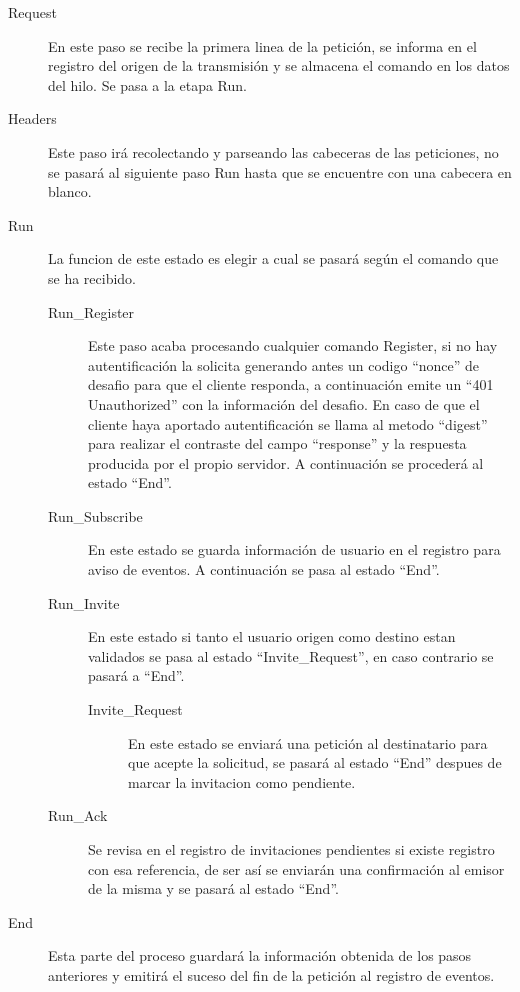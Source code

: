 \documentclass[a4paper,spanish,12pt]{book}
\begin{document}
\begin{description}
	\item[Request] En este paso se recibe la primera linea de la petición, se informa en el registro del origen de la transmisión y se almacena el comando en los datos del hilo. Se pasa a la etapa Run.
	\item[Headers] Este paso irá recolectando y parseando las cabeceras de las peticiones, no se pasará al siguiente paso Run hasta que se encuentre con una cabecera en blanco.
	\item[Run] La funcion de este estado es elegir a cual se pasará según el comando que se ha recibido.
	\begin{description}
		\item[Run\_Register] Este paso acaba procesando cualquier comando Register, si no hay autentificación la solicita generando antes un codigo ``nonce'' de desafio para que el cliente responda, a continuación emite un ``401 Unauthorized'' con la información del desafio. En caso de que el cliente haya aportado autentificación se llama al metodo ``digest'' para realizar el contraste del campo ``response'' y la respuesta producida por el propio servidor. A continuación se procederá al estado ``End''.
		\item[Run\_Subscribe] En este estado se guarda información de usuario en el registro para aviso de eventos. A continuación se pasa al estado ``End''.
		\item[Run\_Invite] En este estado si tanto el usuario origen como destino estan validados se pasa al estado ``Invite\_Request'', en caso contrario se pasará a ``End''.
		\begin{description}
			\item[Invite\_Request] En este estado se enviará una petición al destinatario para que acepte la solicitud, se pasará al estado ``End'' despues de marcar la invitacion como pendiente.
		\end{description}
		\item[Run\_Ack] Se revisa en el registro de invitaciones pendientes si existe registro con esa referencia, de ser así se enviarán una confirmación al emisor de la misma y se pasará al estado ``End''.
	\end{description}
	\item[End] Esta parte del proceso guardará la información obtenida de los pasos anteriores y emitirá el suceso del fin de la petición al registro de eventos.
\end{description}
\end{document}
